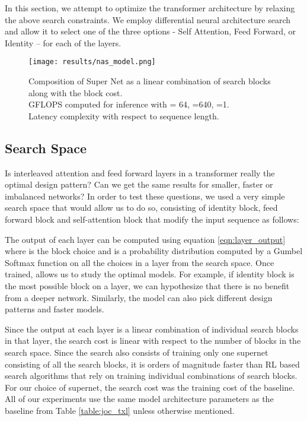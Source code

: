 \documentclass{article}
\begin{document}
In this section, we attempt to optimize the transformer architecture by relaxing the above search constraints. We employ differential neural architecture search and allow it to select one of the three options - Self Attention, Feed Forward, or Identity -- for each of the layers.

\begin{figure}[h]
    \centering
    \texttt{[image: results/nas\_model.png]}
    \captionsetup{justification=centering}
    \caption{Composition of Super Net as a linear combination of search blocks along with the block cost.\\
    GFLOPS computed for inference with  = 64, =640, =1.  \\
    Latency complexity with respect to sequence length.}
    \label{fig:supernet}
\end{figure}  

\subsection{Search Space}

Is interleaved attention and feed forward layers in a transformer really the optimal design pattern? Can we get the same results for smaller, faster or imbalanced networks? In order to test these questions, we used a very simple search space that would allow us to do so, consisting of identity block, feed forward block and self-attention block that modify the input sequence  as follows:





The output of each layer  can be computed using equation  \ref{eqn:layer_output} where  is the block choice and  is a probability distribution computed by a Gumbel Softmax function \cite{gumbel_softmax1, gumbel_softmax2} on all the choices in a layer from the search space. Once trained,  allows us to study the optimal models. For example, if identity block is the most possible block on a layer, we can hypothesize that there is no benefit from a deeper network. Similarly, the model can also pick different design patterns and faster models.





Since the output at each layer is a linear combination of individual search blocks in that layer, the search cost is linear with respect to the number of blocks in the search space. Since the search also consists of training only one supernet consisting of all the search blocks, it is orders of magnitude faster than RL based search algorithms \cite{rl1, rl2} that rely on training individual combinations of search blocks. For our choice of supernet, the search cost was  the training cost of the baseline. All of our experiments use the same model architecture parameters as the baseline from Table \ref{table:joc_txl} unless otherwise mentioned.
\end{document}

